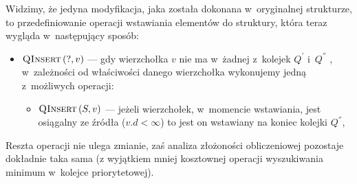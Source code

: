 Widzimy, że jedyna modyfikacja, jaka została dokonana w~oryginalnej strukturze, to przedefiniowanie operacji wstawiania elementów do struktury, która teraz wygląda w~następujący sposób:

\begin{itemize}
\item $\textrm{\textsc{QInsert}} \left( ?, v \right)$ --- gdy wierzchołka $v$ nie ma w~żadnej z~kolejek $Q^{'}$ i~$Q^{''}$ , w~zależności od właściwości danego wierzchołka wykonujemy jedną z~możliwych operacji:
\begin{itemize}
\item $\textrm{\textsc{QInsert}} \left( S, v \right) $ --- jeżeli wierzchołek, w~momencie wstawiania, jest osiągalny ze źródła ($v.d < \infty$) to jest on wstawiany na koniec kolejki $Q^{''}$,
\end{itemize}
\end{itemize}

Reszta operacji nie ulega zmianie, zaś analiza złożoności obliczeniowej pozostaje dokładnie taka sama (z wyjątkiem mniej kosztownej operacji wyszukiwania minimum w~kolejce priorytetowej).

